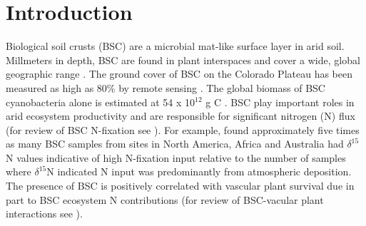 \section{Introduction}


Biological soil crusts (BSC) are a microbial mat-like surface layer in arid
soil. Millmeters in depth, BSC are found in plant interspaces and cover a wide,
global geographic range \citep{garcia2003estimates}. The ground cover of BSC on
the Colorado Plateau has been measured as high as 80\% by remote sensing
\citep{karnieli2001}. The global biomass of BSC cyanobacteria alone is estimated
at 54 x 10$^{12}$ g C \citep{garcia2003estimates}. BSC play important roles in
arid ecosystem productivity and are responsible for significant nitrogen (N)
flux (for review of BSC N-fixation see \citet{belnap2003}). For example,
\citet{Evans_1999} found approximately five times as many BSC samples from
sites in North America, Africa and Australia had $\delta^{15}$N values
indicative of high N-fixation input relative to the number of samples where
$\delta^{15}$N indicated N input was predominantly from atmospheric deposition.
The presence of BSC is positively correlated with vascular plant
survival due in part to BSC ecosystem N contributions (for review of
BSC-vacular plant interactions see \citet{BelnapVascular}).

